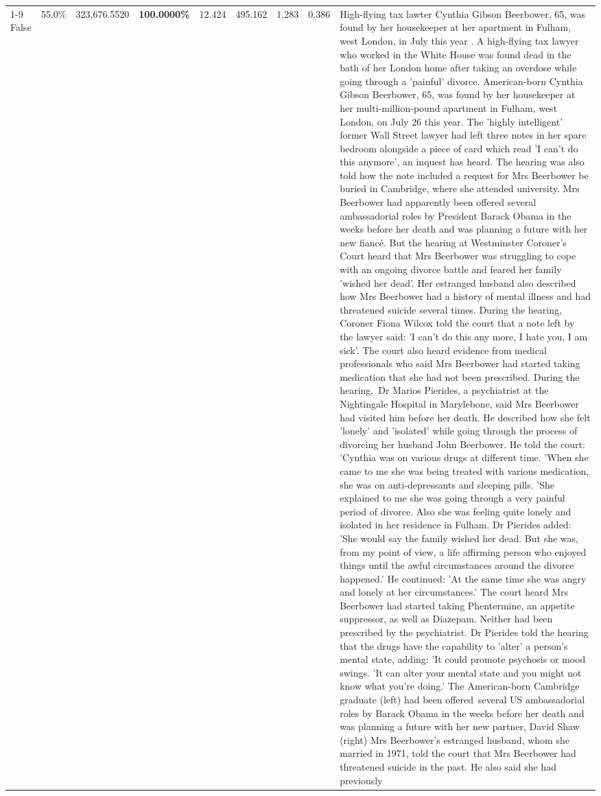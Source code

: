 \begin{table}[H]
\begin{tabular}{lllrlllll}
\cline{1-9}
False & 55.0\% & 323,676.5520 & \bfseries \color{red} 100.0000\% & 12.424 & 495.162 & 1,283 & 0.386 & High-flying tax lawter Cynthia Gibson Beerbower, 65, was found by her housekeeper at her apartment in Fulham, west London, in July this year . A high-flying tax lawyer who worked in the White House was found dead in the bath of her London home after taking an overdose while going through a 'painful' divorce. American-born Cynthia Gibson Beerbower, 65, was found by her housekeeper at her multi-million-pound apartment in Fulham, west London, on July 26 this year. The 'highly intelligent' former Wall Street lawyer had left three notes in her spare bedroom alongside a piece of card which read 'I can't do this anymore', an inquest has heard. The hearing was also told how the note included a request for Mrs Beerbower be buried in Cambridge, where she attended university. Mrs Beerbower had apparently been offered several ambassadorial roles by President Barack Obama in the weeks before her death and was planning a future with her new fiancé. But the hearing at Westminster Coroner's Court heard that Mrs Beerbower was struggling to cope with an ongoing divorce battle and feared her family 'wished her dead'. Her estranged husband also described how Mrs Beerbower had a history of mental illness and had threatened suicide several times. During the hearing, Coroner Fiona Wilcox told the court that a note left by the lawyer said: 'I can't do this any more, I hate you, I am sick'. The court also heard evidence from medical professionals who said Mrs Beerbower had started taking medication that she had not been prescribed. During the hearing, Dr Marios Pierides, a psychiatrist at the Nightingale Hospital in Marylebone, said Mrs Beerbower had visited him before her death. He described how she felt 'lonely' and 'isolated' while going through the process of divorcing her husband John Beerbower. He told the court: 'Cynthia was on various drugs at different time. 'When she came to me she was being treated with various medication, she was on anti-depressants and sleeping pills. 'She explained to me she was going through a very painful period of divorce. Also she was feeling quite lonely and isolated in her residence in Fulham. Dr Pierides added: 'She would say the family wished her dead. But she was, from my point of view, a life affirming person who enjoyed things until the awful circumstances around the divorce happened.' He continued: 'At the same time she was angry and lonely at her circumstances.' The court heard Mrs Beerbower had started taking Phentermine, an appetite suppressor, as well as Diazepam. Neither had been prescribed by the psychiatrist. Dr Pierides told the hearing that the drugs have the capability to 'alter' a person's mental state, adding: 'It could promote psychosis or mood swings. 'It can alter your mental state and you might not know what you're doing.' The American-born Cambridge graduate (left) had been offered several US ambassadorial roles by Barack Obama in the weeks before her death and was planning a future with her new partner, David Shaw (right) Mrs Beerbower's estranged husband, whom she married in 1971, told the court that Mrs Beerbower had threatened suicide in the past. He also said she had previously 
\end{tabular}
\end{table}
